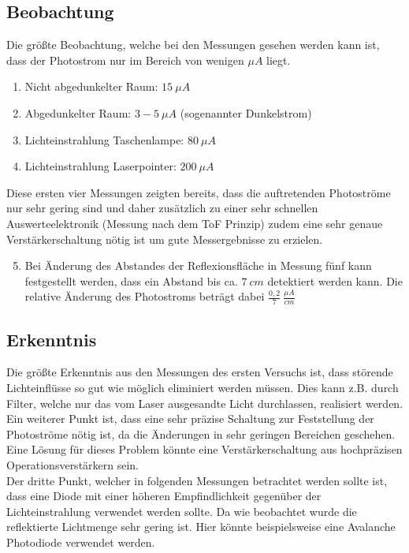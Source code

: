 \subsection{Beobachtung}
Die größte Beobachtung, welche bei den Messungen gesehen werden kann ist, dass der Photostrom nur im Bereich von wenigen $\mu A$ liegt.
\begin{enumerate}
	\item Nicht abgedunkelter Raum: $15\:\mu A$ 
	\item Abgedunkelter Raum: $3-5\:\mu A$  (sogenannter Dunkelstrom)
	\item Lichteinstrahlung Taschenlampe: $80\:\mu A$ 
	\item Lichteinstrahlung Laserpointer: $200\:\mu A$
\end{enumerate}
Diese ersten vier Messungen zeigten bereits, dass die auftretenden Photoströme nur sehr gering sind und daher zusätzlich zu einer sehr schnellen Auswerteelektronik (Messung nach dem \ac{ToF} Prinzip) zudem eine sehr genaue Verstärkerschaltung nötig ist um gute Messergebnisse zu erzielen.
\begin{enumerate}
	\setcounter{enumi}{4}
	\item Bei Änderung des Abstandes der Reflexionsfläche in Messung fünf kann festgestellt werden, dass ein Abstand bis ca. $7\:cm$ detektiert werden kann. Die relative Änderung des Photostroms beträgt dabei $\frac{0,2}{7}\:\frac{\mu A}{cm}$
\end{enumerate}
\subsection{Erkenntnis}
Die größte Erkenntnis aus den Messungen des ersten Versuchs ist, dass störende Lichteinflüsse so gut wie möglich eliminiert werden müssen. Dies kann z.B. durch Filter, welche nur das vom Laser ausgesandte Licht durchlassen, realisiert werden.\\
Ein weiterer Punkt ist, dass eine sehr präzise Schaltung zur Feststellung der Photoströme nötig ist, da die Änderungen in sehr geringen Bereichen geschehen. Eine Lösung für dieses Problem könnte eine Verstärkerschaltung aus hochpräzisen Operationsverstärkern sein.\\
Der dritte Punkt, welcher in folgenden Messungen betrachtet werden sollte ist, dass eine Diode mit einer höheren Empfindlichkeit gegenüber der Lichteinstrahlung verwendet werden sollte. Da wie beobachtet wurde die reflektierte Lichtmenge sehr gering ist. Hier könnte beispielsweise eine Avalanche Photodiode verwendet werden.

